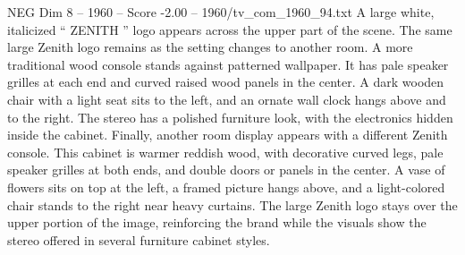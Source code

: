 \begin{textsample}{NEG Dim 8 – 1960 – Score -2.00 – 1960/tv\_com\_1960\_94.txt}
A large white, italicized “ ZENITH ” logo appears across the upper part of the scene.
The same large Zenith logo remains as the setting changes to another room.
A more traditional wood console stands against patterned wallpaper.
It has pale speaker grilles at each end and curved raised wood panels in the center.
A dark wooden chair with a light seat sits to the left, and an ornate wall clock hangs above and to the right.
The stereo has a polished furniture look, with the electronics hidden inside the cabinet.
Finally, another room display appears with a different Zenith console.
This cabinet is warmer reddish wood, with decorative curved legs, pale speaker grilles at both ends, and double doors or panels in the center.
A vase of flowers sits on top at the left, a framed picture hangs above, and a light-colored chair stands to the right near heavy curtains.
The large Zenith logo stays over the upper portion of the image, reinforcing the brand while the visuals show the stereo offered in several furniture cabinet styles.

\end{textsample}
